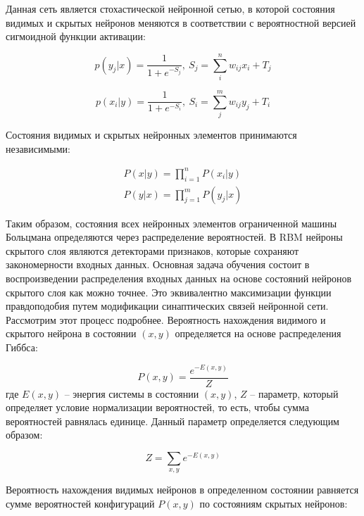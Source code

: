 Данная сеть является стохастической нейронной сетью, в которой состояния видимых и скрытых нейронов меняются в соответствии с вероятностной версией сигмоидной функции активации:

\begin{equation}
	p(y_j\lvert x)=\frac{1}{1+e^{-S_j}},\ S_j=\sum_i^n w_{ij}x_i+T_j
\end{equation}

\begin{equation}
	p(x_i\lvert y)=\frac{1}{1+e^{-S_i}},\ S_i=\sum_j^m w_{ij}y_j+T_i
\end{equation}

Состояния видимых и скрытых нейронных элементов принимаются независимыми:

\begin{equation*}
	\begin{aligned}
		P(x \lvert y) = \prod_{i=1}^n P(x_i \lvert y)\\
		P(y \lvert x) = \prod_{j=1}^m P(y_j \lvert x)
	\end{aligned}	
\end{equation*}

Таким образом, состояния всех нейронных элементов ограниченной машины Больцмана определяются через распределение вероятностей. В RBM нейроны скрытого слоя являются детекторами признаков, которые сохраняют закономерности входных данных. Основная задача обучения состоит в воспроизведении распределения входных данных на основе состояний нейронов скрытого слоя как можно точнее. Это эквивалентно  максимизации функции правдоподобия путем модификации синаптических связей нейронной сети. Рассмотрим этот процесс подробнее. 
Вероятность нахождения видимого и скрытого нейрона в состоянии $(x, y)$ определяется на основе распределения Гиббса:

\begin{equation*}
	P(x, y)=\frac{e^{-E(x,y)}}{Z}
\end{equation*}
где $E(x,y)$ -- энергия системы в состоянии $(x,y)$, $Z$ -- параметр, который определяет условие нормализации вероятностей, то есть, чтобы сумма вероятностей равнялась единице. Данный параметр определяется следующим образом:

\begin{equation*}
	Z=\sum_{x,y} e^{-E(x,y)}
\end{equation*}

Вероятность нахождения видимых нейронов в определенном состоянии равняется сумме вероятностей  конфигураций $P(x,y)$ по состояниям скрытых нейронов:

